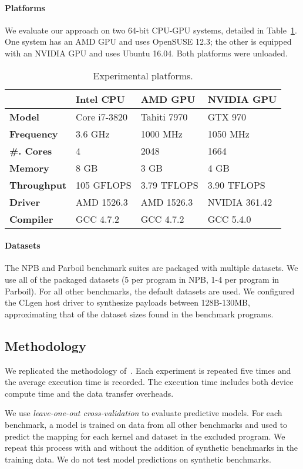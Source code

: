 \paragraph{Platforms} We evaluate our approach on two 64-bit CPU-GPU systems, detailed in Table~\ref{tab:platforms}. One system has an AMD GPU and uses OpenSUSE 12.3; the other is equipped with an NVIDIA GPU and uses Ubuntu 16.04. Both platforms were unloaded.

\begin{table}%
  \scriptsize %
  \centering %
  \begin{tabular}{l l l l}
    \toprule
    & \textbf{Intel CPU} & \textbf{AMD GPU} & \textbf{NVIDIA GPU} \\
    \midrule
    \textbf{Model} & Core i7-3820 & Tahiti 7970 & GTX 970 \\
    \textbf{Frequency} & 3.6 GHz & 1000 MHz & 1050 MHz \\
    \textbf{\#. Cores} & 4 & 2048 & 1664 \\
    \textbf{Memory} & 8 GB & 3 GB & 4 GB \\
    \textbf{Throughput} & 105 GFLOPS & 3.79 TFLOPS & 3.90 TFLOPS \\
    \textbf{Driver} & AMD 1526.3 & AMD 1526.3 & NVIDIA 361.42 \\
    \textbf{Compiler} & GCC 4.7.2 & GCC 4.7.2 & GCC 5.4.0 \\
  \end{tabular}
  \caption{Experimental platforms.}
  \label{tab:platforms}
\end{table}

\paragraph{Datasets} The NPB and Parboil benchmark suites are packaged with multiple datasets. We use all of the packaged datasets (5 per program in NPB, 1-4 per program in Parboil). For all other benchmarks, the default datasets are used. We configured the CLgen host driver to synthesize payloads between 128B-130MB, approximating that of the dataset sizes found in the benchmark programs.

\subsection{Methodology}

We replicated the methodology of~\cite{Grewe2013}. Each experiment is repeated five times and the average execution time is recorded. The execution time includes both device compute time and the data transfer overheads.

We use \emph{leave-one-out cross-validation} to evaluate predictive models. For each benchmark, a model is trained on data from all other benchmarks and used to predict the mapping for each kernel and dataset in the excluded program. We repeat this process with and without the addition of synthetic benchmarks in the training data. We do not test model predictions on synthetic benchmarks.

